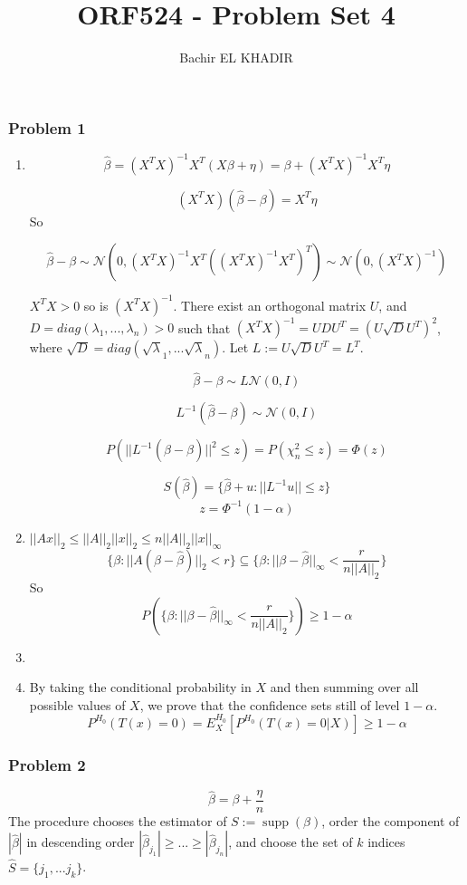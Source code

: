 \documentclass[12pt]{article}
\title{ORF524 - Problem Set 4}
\author{Bachir EL KHADIR }
\newcommand{\Q}[1]{\subsubsection*{Problem #1}}
\begin{document}
\maketitle

\Q{1}
\begin{enumerate}
\item 
$$\hat \beta = (X^TX)^{-1}X^T(X\beta + \eta) = \beta + (X^TX)^{-1}X^T\eta$$

$$ (X^TX)(\hat \beta - \beta) = X^T \eta$$
So


$$\hat \beta - \beta \sim \mathcal N(0, (X^TX)^{-1}X^T ((X^TX)^{-1}X^T)^T) \sim \mathcal N(0, (X^TX)^{-1})$$


$X^TX > 0$ so is $(X^TX)^{-1}$. There exist an orthogonal matrix $U$, and $D = diag(\lambda_1,...,\lambda_n) > 0$ such that $(X^TX)^{-1} = UDU^T = (U \sqrt D U^T)^2$, where $\sqrt D = diag(\sqrt \lambda_1, ... \sqrt \lambda_n)$. Let $L := U \sqrt D U^T = L^T$.


$$\hat \beta - \beta \sim L \mathcal  N(0, I)$$

$$L^{-1}(\hat \beta - \beta) \sim \mathcal  N(0, I)$$

$$P(||L^{-1}(\hat \beta - \beta)||^2 \leq z ) = P(\chi_n^2 \leq z ) = \Phi(z)$$ 

$$S(\hat \beta) = \{ \hat \beta + u : ||L^{-1}u|| \leq z \}$$
$$ z = \Phi^{-1}(1 - \alpha)$$

\item $||Ax||_2 \le ||A||_2 ||x||_2 \le n ||A||_2 ||x||_{\infty}$
$$\{\beta: ||A(\beta - \hat \beta)||_2 < r \}  \subseteq
\{\beta: ||\beta - \hat \beta||_{\infty} 
< \frac r {n||A||_2} \}$$
So $$P(\{\beta: ||\beta - \hat \beta||_{\infty} 
< \frac r {n||A||_2} \}) \ge 1 - \alpha$$

\item 

\item 
By taking the conditional probability in $X$ and then summing over all possible values of $X$, we prove that the confidence sets still of level $1 - \alpha$.
$$P^{H_0}(T(x) = 0) = E^{H_0}_X[P^{H_0}(T(x) = 0|X)] \ge 1 - \alpha$$


\end{enumerate}

\Q{2}
$$\hat \beta = \beta + \frac{\eta}n$$
The procedure chooses the estimator of $S := \operatorname{supp}(\beta)$, order the component of $|\hat \beta|$ in descending order $|\hat \beta_{j_1}| \ge ... \ge |\hat \beta_{j_n}|$, and choose the set of $k$ indices $\hat S = \{j_1, ... j_k\}$.
\end{document}
